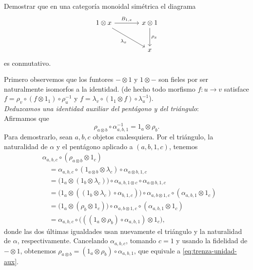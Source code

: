 \begin{ejer}
Demostrar que en una categoría monoidal simétrica el diagrama
\[
\begin{tikzcd}[column sep=large, row sep=large]
1\otimes x \arrow[r,"B_{1,x}"] \arrow[dr,"\lambda_x"'] & x\otimes1 \arrow[d,"\rho_x"]\\
& x
\end{tikzcd}
\]
es conmutativo.
\end{ejer}
\begin{sol}
Primero observemos que los funtores $-\otimes1$ y $1\otimes-$ son fieles por ser naturalmente isomorfos a la identidad. (de hecho todo morfismo $f\colon u\to v$ satisface $f=\rho_v\circ(f\otimes1_1)\circ\rho_u^{-1}$ y $f=\lambda_v\circ(1_1\otimes f)\circ\lambda_u^{-1}$).
\medskip\\
\emph{Deduzcamos una identidad auxiliar del pentágono y del triángulo}:\\
Afirmamos que
\begin{equation}\label{eq:trenza-unidad-aux}
\rho_{a\otimes b}\circ\alpha^{-1}_{a,b,1}
=1_a\otimes\rho_b.
\end{equation}
Para demostrarlo, sean $a,b,c$ objetos cualesquiera. Por el triángulo, la naturalidad de $\alpha$ y el pentágono aplicado a $(a,b,1,c)$, tenemos
\begin{align*}
&\alpha_{a,b,c}\circ(\rho_{a\otimes b}\otimes1_c)\\
&\quad=\alpha_{a,b,c}\circ(1_{a\otimes b}\otimes\lambda_c)
       \circ\alpha_{a\otimes b,1,c}\\
&\quad=\bigl(1_a\otimes(1_b\otimes\lambda_c)\bigr)
       \circ\alpha_{a,b,1\otimes c}\circ\alpha_{a\otimes b,1,c}\\
&\quad=\bigl(1_a\otimes((1_b\otimes\lambda_c)
       \circ\alpha_{b,1,c})\bigr)
       \circ\alpha_{a,b\otimes1,c}\circ(\alpha_{a,b,1}\otimes1_c)\\
&\quad=\bigl(1_a\otimes(\rho_b\otimes1_c)\bigr)
       \circ\alpha_{a,b\otimes1,c}\circ(\alpha_{a,b,1}\otimes1_c)\\
&\quad=\alpha_{a,b,c}\circ
       \bigl(((1_a\otimes\rho_b)\circ\alpha_{a,b,1})\otimes1_c\bigr),
\end{align*}
donde las dos últimas igualdades usan nuevamente el triángulo y la naturalidad de $\alpha$, respectivamente. Cancelando $\alpha_{a,b,c}$, tomando $c=1$ y usando la fidelidad de $-\otimes1$, obtenemos $\rho_{a\otimes b}=(1_a\otimes\rho_b)\circ\alpha_{a,b,1}$, que equivale a \eqref{eq:trenza-unidad-aux}.
\medskip\\

\end{sol}
